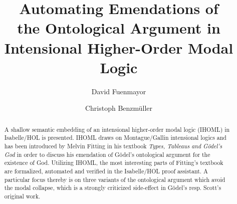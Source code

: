 \documentclass{llncs}
\begin{document}
%
\frontmatter          %
%
\pagestyle{headings}  %

%
\mainmatter              %
%
\title{Automating Emendations of \\
	the Ontological Argument in\\
	Intensional Higher-Order Modal Logic}
%
\author{David Fuenmayor \and Christoph Benzm\"uller}
%

%

\maketitle              %

\begin{abstract}
	A shallow semantic embedding of an intensional higher-order modal logic (IHOML) in Isabelle/HOL is presented.
	IHOML draws on Montague/Gallin intensional logics and has been introduced by Melvin Fitting in his textbook
	\emph{Types, Tableaus and G\"odel's God} in order to discuss his emendation of G\"odel's ontological argument for the existence of God.
	Utilizing IHOML, the most interesting parts of Fitting's textbook are formalized, automated and verified
	in the Isabelle/HOL proof assistant. A particular focus thereby is on three variants of the ontological argument
	which avoid the modal collapse, which is a strongly criticized side-effect in G\"odel's resp. Scott's original work.
\end{abstract}







%




%
\end{document}
